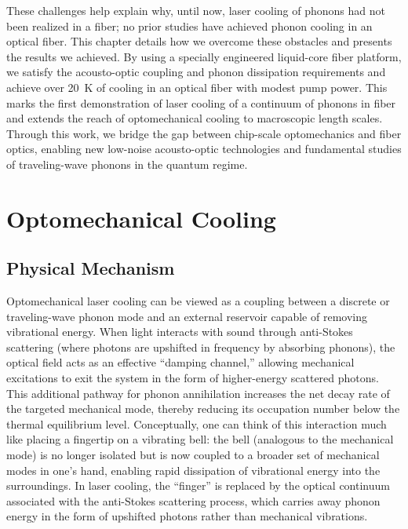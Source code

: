 These challenges help explain why, until now, laser cooling of phonons had not been realized in a fiber; no prior studies have achieved phonon cooling in an optical fiber. This chapter details how we overcome these obstacles and presents the results we achieved. By using a specially engineered liquid-core fiber platform, we satisfy the acousto-optic coupling and phonon dissipation requirements and achieve over \SI{20}{\kelvin} of cooling in an optical fiber with modest pump power. This marks the first demonstration of laser cooling of a continuum of phonons in fiber and extends the reach of optomechanical cooling to macroscopic length scales. Through this work, we bridge the gap between chip-scale optomechanics and fiber optics, enabling new low-noise acousto-optic technologies and fundamental studies of traveling-wave phonons in the quantum regime.


\section{Optomechanical Cooling}
\label{Cooling:sec:Optomechanical Cooling}

\subsection{Physical Mechanism}
\label{Cooling:subsec:PhysicalMechanism}

Optomechanical laser cooling can be viewed as a coupling between a discrete or traveling-wave phonon mode and an external reservoir capable of removing vibrational energy. When light interacts with sound through anti-Stokes scattering (where photons are upshifted in frequency by absorbing phonons), the optical field acts as an effective “damping channel,” allowing mechanical excitations to exit the system in the form of higher-energy scattered photons. This additional pathway for phonon annihilation increases the net decay rate of the targeted mechanical mode, thereby reducing its occupation number below the thermal equilibrium level. Conceptually, one can think of this interaction much like placing a fingertip on a vibrating bell: the bell (analogous to the mechanical mode) is no longer isolated but is now coupled to a broader set of mechanical modes in one’s hand, enabling rapid dissipation of vibrational energy into the surroundings. In laser cooling, the “finger” is replaced by the optical continuum associated with the anti-Stokes scattering process, which carries away phonon energy in the form of upshifted photons rather than mechanical vibrations.

